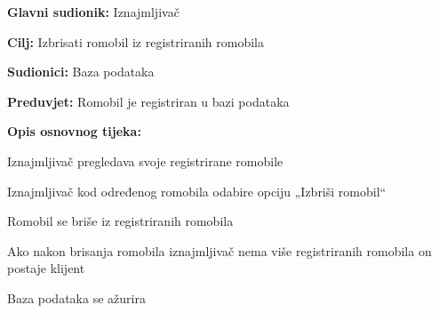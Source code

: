 						\noindent {}
						\begin{packed_item}
							
							\item \textbf{Glavni sudionik: }Iznajmljivač
							\item  \textbf{Cilj: }Izbrisati romobil iz registriranih romobila
							\item  \textbf{Sudionici:} Baza podataka
							\item  \textbf{Preduvjet:} Romobil je registriran u bazi podataka 
							\item  \textbf{Opis osnovnog tijeka:}
							
							\item[] \begin{packed_enum}
								
								\item Iznajmljivač pregledava svoje registrirane romobile 
								\item Iznajmljivač kod određenog romobila odabire opciju „Izbriši romobil“ 
								\item Romobil se briše iz registriranih romobila 
								\item Ako nakon brisanja romobila iznajmljivač nema više registriranih romobila on postaje klijent
								\item Baza podataka se ažurira
								   
							\end{packed_enum}
							
						\end{packed_item}
						\noindent {}
